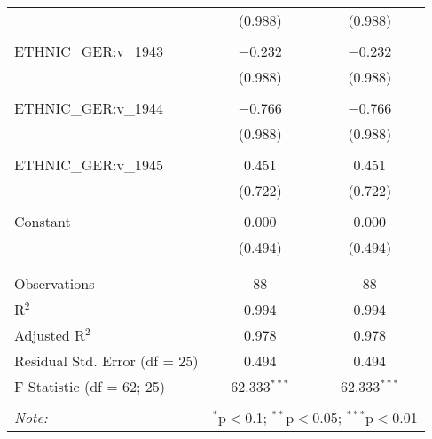 \begin{table}[!htbp]
\begin{tabular}{@{\extracolsep{5pt}}lcc}
  & (0.988) & (0.988) \\ 
  & & \\ 
 ETHNIC\_GER:v\_1943 & $-$0.232 & $-$0.232 \\ 
  & (0.988) & (0.988) \\ 
  & & \\ 
 ETHNIC\_GER:v\_1944 & $-$0.766 & $-$0.766 \\ 
  & (0.988) & (0.988) \\ 
  & & \\ 
 ETHNIC\_GER:v\_1945 & 0.451 & 0.451 \\ 
  & (0.722) & (0.722) \\ 
  & & \\ 
 Constant & 0.000 & 0.000 \\ 
  & (0.494) & (0.494) \\ 
  & & \\ 
\hline \\[-1.8ex] 
Observations & 88 & 88 \\ 
R$^{2}$ & 0.994 & 0.994 \\ 
Adjusted R$^{2}$ & 0.978 & 0.978 \\ 
Residual Std. Error (df = 25) & 0.494 & 0.494 \\ 
F Statistic (df = 62; 25) & 62.333$^{***}$ & 62.333$^{***}$ \\ 
\hline 
\hline \\[-1.8ex] 
\textit{Note:}  & \multicolumn{2}{r}{$^{*}$p$<$0.1; $^{**}$p$<$0.05; $^{***}$p$<$0.01} \\ 
\end{tabular} 
\end{table} 